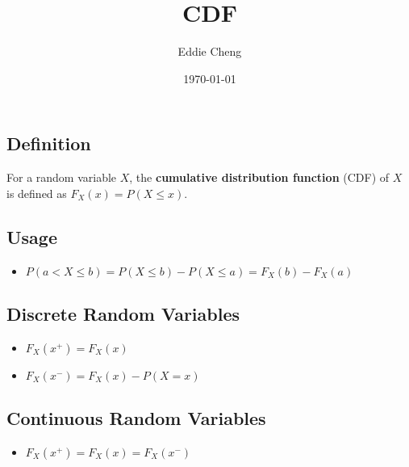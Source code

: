 \documentclass[12pt,a4paper]{article}
\title{CDF}
\author{Eddie Cheng}
\date{\today}
\begin{document}
\maketitle
\subsection*{Definition}
For a random variable $X$, the \textbf{cumulative distribution function} (CDF) of $X$ is defined as $F_X(x) = P(X \leq x)$.

\subsection*{Usage}
\begin{itemize}
\item $P(a < X \leq b) = P(X \leq b) - P(X \leq a) = F_X(b) - F_X(a)$
\end{itemize}

\subsection*{Discrete Random Variables}
\begin{itemize}
  \item $F_X(x^+) = F_X(x)$
  \item $F_X(x^-) = F_X(x) - P(X = x)$
\end{itemize}

\subsection*{Continuous Random Variables}
\begin{itemize}
  \item $F_X(x^+) = F_X(x) = F_X(x^-)$
\end{itemize}
\end{document}
